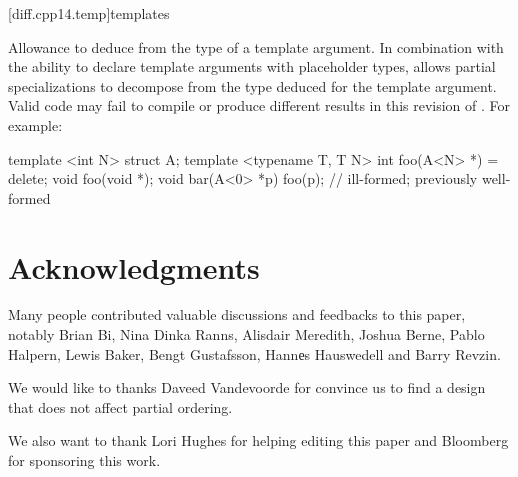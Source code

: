 \documentclass{wg21}
\begin{document}

[diff.cpp14.temp]{templates}

\change
Allowance to deduce from the type of a  template argument.
\rationale
In combination with the ability to declare
 template arguments with placeholder types,
allows partial specializations to decompose
from the type deduced for the  template argument.
\effect
Valid \CppXIV{} code may fail to compile
or produce different results in this revision of \Cpp{}.
For example:
\begin{codeblock}
    template <int N> struct A;
    template <typename T, T N> int foo(A<N> *) = delete;
    void foo(void *);
    void bar(A<0> *p) {
        foo(p);           // ill-formed; previously well-formed
    }
\end{codeblock}


\section{Acknowledgments}
Many people contributed valuable discussions and feedbacks to this paper, notably
Brian Bi, Nina Dinka Ranns, Alisdair Meredith, Joshua Berne, Pablo Halpern, Lewis Baker, Bengt Gustafsson,
Hannеs Hauswedell and Barry Revzin.

We would like to thanks Daveed Vandevoorde for convince us to find a design that does not affect partial ordering.

We also want to thank Lori Hughes for helping editing this paper and Bloomberg for sponsoring this work.






\renewcommand{\section}[2]{}%

\begin{thebibliography}{9}


\end{thebibliography}
\end{document}
